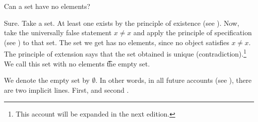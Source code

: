 

Can a set have no elements?


Sure.
Take a set.
At least one exists by the principle of existence (see ).
Now, take the universally false statement $x \neq x$ and apply the principle of specification (see ) to that set.
The set we get has no elements, since no object satisfies $x \neq x$.
The principle of extension says that the set obtained is unique (contradiction).\footnote{This account will be expanded in the next edition.}
We call this set with no elements \t{the empty set.}



%
%


We denote the empty set by $\emptyset$.
In other words, in all future accounts (see ), there are two implicit lines. First,  and second .

\blankpage